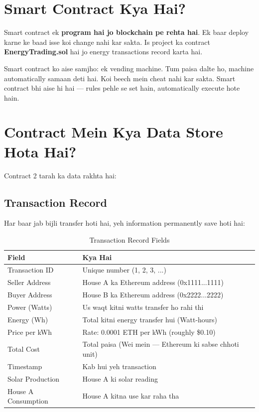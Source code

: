 \section{Smart Contract Kya Hai?}

Smart contract ek \textbf{program hai jo blockchain pe rehta hai}. Ek baar deploy karne ke baad isse koi change nahi kar sakta. Is project ka contract \textbf{EnergyTrading.sol} hai jo energy transactions record karta hai.

\begin{tipbox}
Smart contract ko aise samjho: ek vending machine. Tum paisa dalte ho, machine automatically samaan deti hai. Koi beech mein cheat nahi kar sakta. Smart contract bhi aise hi hai --- rules pehle se set hain, automatically execute hote hain.
\end{tipbox}

\section{Contract Mein Kya Data Store Hota Hai?}

Contract 2 tarah ka data rakhta hai:

\subsection{Transaction Record}

Har baar jab bijli transfer hoti hai, yeh information permanently save hoti hai:

\begin{table}[H]
\centering
\begin{tabularx}{\textwidth}{l X}
\toprule
\textbf{Field} & \textbf{Kya Hai} \\
\midrule
Transaction ID & Unique number (1, 2, 3, ...) \\
Seller Address & House A ka Ethereum address (0x1111...1111) \\
Buyer Address & House B ka Ethereum address (0x2222...2222) \\
Power (Watts) & Us waqt kitni watts transfer ho rahi thi \\
Energy (Wh) & Total kitni energy transfer hui (Watt-hours) \\
Price per kWh & Rate: 0.0001 ETH per kWh (roughly \$0.10) \\
Total Cost & Total paisa (Wei mein --- Ethereum ki sabse chhoti unit) \\
Timestamp & Kab hui yeh transaction \\
Solar Production & House A ki solar reading \\
House A Consumption & House A kitna use kar raha tha \\
\bottomrule
\end{tabularx}
\caption{Transaction Record Fields}
\end{table}

